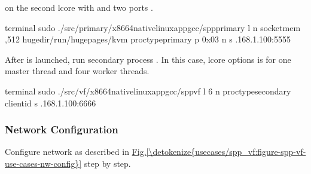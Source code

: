 \documentclass[a4paper,11pt,openany,oneside,english]{sphinxmanual}
\begin{document}
 on the second lcore with  and two ports .

\begin{sphinxVerbatim}[commandchars=\\\{\},formatcom=\footnotesize]
 terminal 
 sudo ./src/primary/x86\PYGZus{}64\PYGZhy{}native\PYGZhy{}linuxapp\PYGZhy{}gcc/spp\PYGZus{}primary 
    \PYGZhy{}l  \PYGZhy{}n  
    \PYGZhy{}\PYGZhy{}socket\PYGZhy{}mem ,512 
    \PYGZhy{}\PYGZhy{}huge\PYGZhy{}dir/run/hugepages/kvm 
    \PYGZhy{}\PYGZhy{}proc\PYGZhy{}typeprimary 
    \PYGZhy{}\PYGZhy{} 
    \PYGZhy{}p 0x03 
    \PYGZhy{}n  \PYGZhy{}s .168.1.100:5555
\end{sphinxVerbatim}

After  is launched, run secondary process .
In this case, lcore options is  for one master thread and four
worker threads.

\begin{sphinxVerbatim}[commandchars=\\\{\},formatcom=\footnotesize]
 terminal 
 sudo ./src/vf/x86\PYGZus{}64\PYGZhy{}native\PYGZhy{}linuxapp\PYGZhy{}gcc/spp\PYGZus{}vf 
   \PYGZhy{}l \PYGZhy{}6 
   \PYGZhy{}n  \PYGZhy{}\PYGZhy{}proc\PYGZhy{}typesecondary 
   \PYGZhy{}\PYGZhy{} 
   \PYGZhy{}\PYGZhy{}client\PYGZhy{}id  
   \PYGZhy{}s .168.1.100:6666 
\end{sphinxVerbatim}


\subsubsection{Network Configuration}
\label{\detokenize{usecases/spp_vf:network-configuration}}
Configure network as described in \hyperref[\detokenize{usecases/spp_vf:figure-spp-vf-use-cases-nw-config}]{Fig.\@ \ref{\detokenize{usecases/spp_vf:figure-spp-vf-use-cases-nw-config}}}
step by step.
\end{document}
